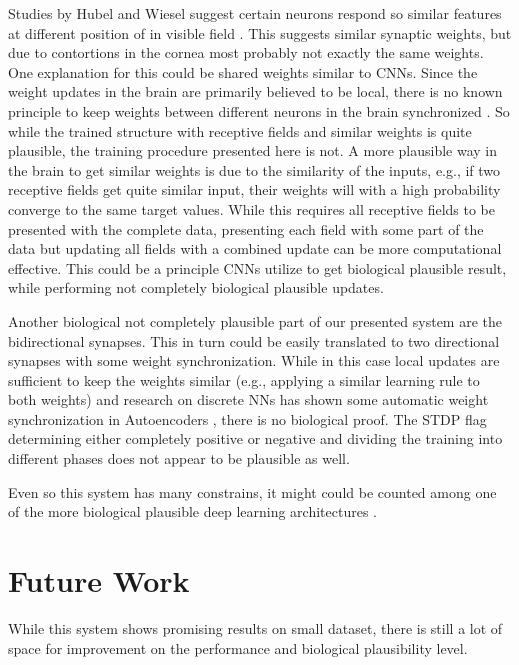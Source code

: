 Studies by Hubel and Wiesel suggest certain neurons respond so similar features at different position of in visible field \cite{Hubel1959}.
This suggests similar synaptic weights, but due to contortions in the cornea most probably not exactly the same weights. 
One explanation for this could be shared weights similar to CNNs. 
Since the weight updates in the brain are primarily believed to be local, there is no known principle to keep weights between different neurons in the brain synchronized \cite{DBLP:journals/corr/ScellierB16}.
So while the trained structure with receptive fields and similar weights is quite plausible, the training procedure presented here is not.
A more plausible way in the brain to get similar weights is due to the similarity of the inputs, e.g., if two receptive fields get quite similar input, their weights will with a high probability converge to the same target values.  
While this requires all receptive fields to be presented with the complete data, presenting each field with some part of the data but updating all fields with a combined update can be more computational effective. 
This could be a principle CNNs utilize to get biological plausible result, while performing not completely biological plausible updates.

Another biological not completely plausible part of our presented system are the bidirectional synapses.
This in turn could be easily translated to two directional synapses with some weight synchronization. 
While in this case local updates are sufficient to keep the weights similar (e.g., applying a similar learning rule to both weights) and research on discrete NNs has shown some automatic weight synchronization in Autoencoders \cite{vincent2010stacked}, there is no biological proof.
The STDP flag determining either completely positive or negative and dividing the training into different phases does not appear to be plausible as well.

Even so this system has many constrains, it might could be counted among one of the more biological plausible deep learning architectures \cite{bengio2015towards}.     

\section{Future Work} \label{c:future}

While this system shows promising results on small dataset, there is still a lot of space for improvement on the performance and biological plausibility level.

